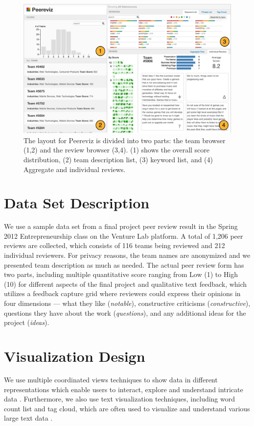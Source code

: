 \documentclass{sigchi}
\begin{document}
\begin{figure}[ht]
\centering
\includegraphics[width=2.0\columnwidth]{images/overview-annotated}
\caption{The layout for Peereviz is divided into two parts:
the team browser (1,2) and the review browser (3,4).
(1) shows the overall score distribution,
(2) team description list,
(3) keyword list, and
(4) Aggregate and individual reviews.}
\label{fig:overview-annotated}
\end{figure}

\section{Data Set Description}
We use a sample data set from a final project peer review result in the Spring
2012 Entrepreneurship class on the Venture Lab platform. A total of 1,206 peer
reviews are collected, which consists of 116 teams being reviewed and 212
individual reviewers. For privacy reasons, the team names are anonymized and we
presented team description as much as needed. The actual peer review form has
two parts, including multiple quantitative score ranging from Low (1) to
High (10) for different aspects of the final project and qualitative text
feedback, which utilizes a feedback capture grid \cite{dbootcamp} where
reviewers could express their opinions in four dimensions --- what they
like (\emph{notable}), constructive criticisms (\emph{constructive}), questions
they have about the work (\emph{questions}), and any additional ideas for the
project (\emph{ideas}).



\section{Visualization Design}
We use multiple coordinated views techniques to
show data in different representations which enable users to interact, explore
and understand intricate data \cite{roberts2007state}. Furthermore, we also
use text visualization techniques, including word count list and tag cloud,
which are often used to visualize and understand various large text data
\cite{kuo2007tag, wordcountwww}.
\end{document}
